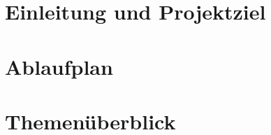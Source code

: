 \documentclass{article}
\title{\Projektname{}}
\author{\Projektautoren{}}
\date{\Projektstart{} bis \Projektende{}}
\begin{document}
    \maketitle
    \section*{Einleitung und Projektziel}
        
    \tableofcontents

    \newpage
    \section{Ablaufplan}
        

    \newpage
    \section{Themenüberblick}
        
\end{document}

